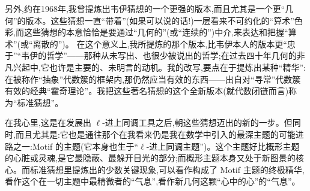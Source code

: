 另外,约在1968年,我曾提炼出韦伊猜想的一个更强的版本,而且尤其是一个更“几何”的版本。这些猜想一直“带着”(如果可以说的话!)一层看来不可约化的“算术”色彩,而这些猜想的本意恰恰是要通过“几何的”(或“连续的”)中介,来表达和把握“算术”(或“离散的”)。
 在这个意义上,我所提炼的那个版本,比韦伊本人的版本更“忠于”“韦伊的哲学”——那种从未写出、也很少被说出的哲学;在过去四十年几何的非凡兴起中,它也许是主要的、未明言的动机。我的改写,要点在于提炼出某种“精华”:在被称作“抽象”代数簇的框架内,那仍然应当有效的东西——出自对“寻常”代数簇有效的经典“霍奇理论”。我把这些著名猜想的这个全新版本(就代数闭链而言)称为“标准猜想”。

在我心里,这是在发展出 $\ell$-进上同调工具之后,朝这些猜想迈出的新的一步。但同时,而且尤其是:它也是通往那个在我看来仍是我在数学中引入的最深主题的可能进路之一:Motif 的主题(它本身也生于“$\ell$-进上同调主题”)。这个主题好比概形主题的心脏或灵魂,是它最隐蔽、最躲开目光的部分;而概形主题本身又处于新图景的核心。而标准猜想里提炼出的少数关键现象,可以看作构成了 Motif 主题的终极精华,看作这个在一切主题中最精微者的“气息”,看作新几何这颗“心中的心”的“气息”。

